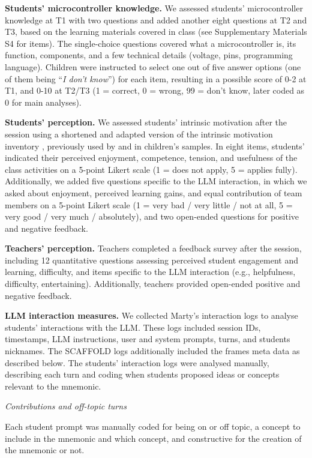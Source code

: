 \documentclass[fleqn,10pt]{wlscirep}
\begin{document}
\textbf{Students' microcontroller knowledge.} We assessed students' microcontroller knowledge at T1 with two questions and added another eight questions at T2 and T3, based on the learning materials covered in class (see Supplementary Materials S4 for items). The single-choice questions covered what a microcontroller is, its function, components, and a few technical details (voltage, pins, programming language). Children were instructed to select one out of five answer options (one of them being ``\textit{I don't know}'') for each item, resulting in a possible score of 0-2 at T1, and 0-10 at T2/T3 (1 = correct, 0 = wrong, 99 = don't know, later coded as 0 for main analyses).

\textbf{Students' perception.} We assessed students' intrinsic motivation after the session using a shortened and adapted version of the intrinsic motivation inventory \cite{Deci1985, Wilde2009}, previously used by \cite{Heindl2020} and \cite{Rollke2022} in children's samples. In eight items, students' indicated their perceived enjoyment, competence, tension, and usefulness of the class activities on a 5-point Likert scale (1 = does not apply, 5 = applies fully). Additionally, we added five questions specific to the LLM interaction, in which we asked about enjoyment, perceived learning gains, and equal contribution of team members on a 5-point Likert scale (1 = very bad / very little / not at all, 5 = very good / very much / absolutely), and two open-ended questions for positive and negative feedback.

\textbf{Teachers' perception.} Teachers completed a feedback survey after the session, including 12 quantitative questions assessing perceived student engagement and learning, difficulty, and items specific to the LLM interaction (e.g., helpfulness, difficulty, entertaining). Additionally, teachers provided open-ended positive and negative feedback.

\textbf{LLM interaction measures.} We collected Marty's interaction logs to analyse students' interactions with the LLM. These logs included session IDs, timestamps, LLM instructions, user and system prompts, turns, and students nicknames. The SCAFFOLD logs additionally included the frames meta data as described below. The students' interaction logs were analysed manually, describing each turn and coding when students proposed ideas or concepts relevant to the mnemonic.

\textit{Contributions and off-topic turns}

Each student prompt was manually coded for being on or off topic, a concept to include in the mnemonic and which concept, and constructive for the creation of the mnemonic or not.
\end{document}

